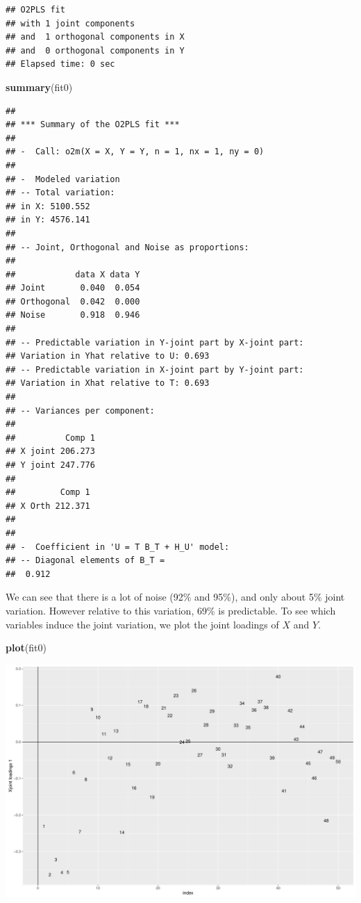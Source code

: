 \documentclass[]{article}
\newenvironment{Shaded}{\begin{snugshade}}{\end{snugshade}}
\newcommand{\KeywordTok}[1]{\textcolor[rgb]{0.13,0.29,0.53}{\textbf{{#1}}}}
\newcommand{\NormalTok}[1]{{#1}}
\begin{document}
\begin{verbatim}
## O2PLS fit 
## with 1 joint components  
## and  1 orthogonal components in X 
## and  0 orthogonal components in Y 
## Elapsed time: 0 sec
\end{verbatim}

\begin{Shaded}
\begin{Highlighting}[]
\KeywordTok{summary}\NormalTok{(fit0)}
\end{Highlighting}
\end{Shaded}

\begin{verbatim}
## 
## *** Summary of the O2PLS fit *** 
## 
## -  Call: o2m(X = X, Y = Y, n = 1, nx = 1, ny = 0) 
## 
## -  Modeled variation
## -- Total variation:
## in X: 5100.552 
## in Y: 4576.141 
## 
## -- Joint, Orthogonal and Noise as proportions:
## 
##            data X data Y
## Joint       0.040  0.054
## Orthogonal  0.042  0.000
## Noise       0.918  0.946
## 
## -- Predictable variation in Y-joint part by X-joint part:
## Variation in Yhat relative to U: 0.693 
## -- Predictable variation in X-joint part by Y-joint part:
## Variation in Xhat relative to T: 0.693 
## 
## -- Variances per component:
## 
##          Comp 1
## X joint 206.273
## Y joint 247.776
## 
##         Comp 1
## X Orth 212.371
## 
## 
## -  Coefficient in 'U = T B_T + H_U' model:
## -- Diagonal elements of B_T =
##  0.912
\end{verbatim}

We can see that there is a lot of noise (92\% and 95\%), and only about
5\% joint variation. However relative to this variation, 69\% is
predictable. To see which variables induce the joint variation, we plot
the joint loadings of \(X\) and \(Y\).

\begin{Shaded}
\begin{Highlighting}[]
\KeywordTok{plot}\NormalTok{(fit0)}
\end{Highlighting}
\end{Shaded}

\includegraphics{Figs/unnamed-chunk-5-1.pdf}
\end{document}
